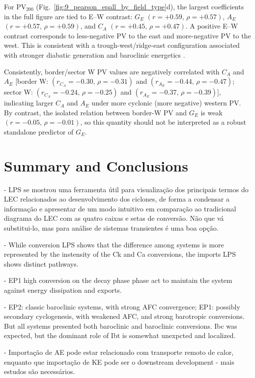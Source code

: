 \documentclass[pdflatex,sn-chicago]{sn-jnl}%
\theoremstyle{plain}
\theoremstyle{definition}
\theoremstyle{remark}
\theoremstyle{definition}
\begin{document}
For $\mathrm{PV}_{200}$ (Fig.~\ref{fig:9_pearson_epall_by_field_type}d), the largest coefficients in the full figure are tied to E--W contrast: $G_E$ $(r=+0.59,\,\rho=+0.57)$, $A_E$ $(r=+0.57,\,\rho=+0.59)$, and $C_A$ $(r=+0.45,\,\rho=+0.47)$. A positive E--W contrast corresponds to less-negative PV to the east and more-negative PV to the west. This is consistent with a trough-west/ridge-east configuration associated with stronger diabatic generation and baroclinic energetics \citep{hoskins1985use,davis1991potential}.

Consistently, border/sector W PV values are negatively correlated with $C_A$ and $A_E$ [border W: $(r_{C_A}=-0.30,\,\rho=-0.31)$ and $(r_{A_E}=-0.44,\,\rho=-0.47)$; sector W: $(r_{C_A}=-0.24,\,\rho=-0.25)$ and $(r_{A_E}=-0.37,\,\rho=-0.39)$], indicating larger $C_A$ and $A_E$ under more cyclonic (more negative) western PV. By contrast, the isolated relation between border-W PV and $G_E$ is weak $(r=-0.05,\,\rho=-0.01)$, so this quantity should not be interpreted as a robust standalone predictor of $G_E$.

\section{Summary and Conclusions}

- LPS se mostrou uma ferramenta útil para visualização dos principais termos do LEC relacionados ao desenvolvimento dos ciclones, de forma a condensar a informação e apresentar de um modo intuitivo em comparação ao tradicional diagrama do LEC com as quatro caixas e setas de conversão. Não que vá substitui-lo, mas para análise de sistemas transientes é uma boa opção.

-  While conversion LPS shows that the difference among systems is more represented by the instensity of the Ck and Ca conversions, the imports LPS shows distinct pathways.

- EP1 high conversion on the decay phase phase act to maintain the system against energy dissipation \citep{de2025lorenz} and exports.

- EP2: classic baroclinic systems, with strong AFC convergence; EP1: possibly secondary cyclogenesis, with weakened AFC, and strong barotropic conversions. But all systems presented both baroclinic and baroclinic conversions. Ibc was expected, but the dominant role of Ibt is somewhat unexpcted and localized. 

- Importação de AE pode estar relacionado com transporte remoto de calor, enquanto que importação de KE pode ser o downstream development - mais estudos são necessários.
\end{document}
